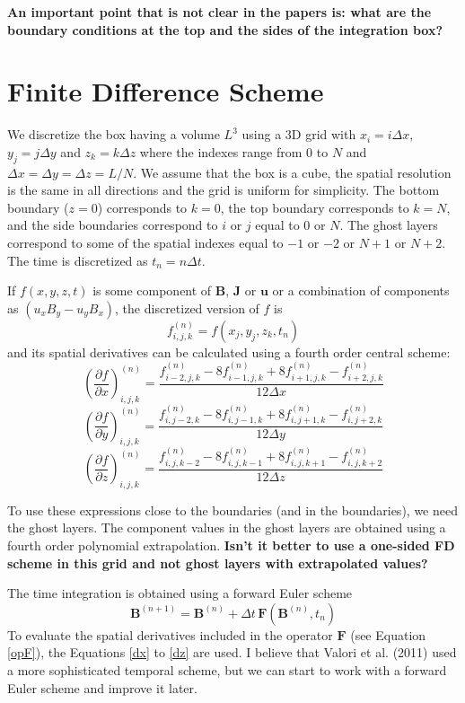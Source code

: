 \documentclass[a4paper,10pt]{article}
\def\bB{{\boldsymbol{B}}}
\def\bJ{{\boldsymbol{J}}}
\def\bu{{\boldsymbol{u}}}
\def\dx#1{\frac{\partial #1}{\partial x}}
\def\dy#1{\frac{\partial #1}{\partial y}}
\def\dz#1{\frac{\partial #1}{\partial z}}
\def\f#1#2#3#4{{f}_{#1,#2,#3}^{(#4)}}
\def\bF#1{\boldsymbol{F}(#1)}
\begin{document}
{\bf An important point that is not clear in the papers is: what are the boundary conditions at the top and the sides of the integration box?}

\section{Finite Difference Scheme}

We discretize the box having a volume $L^3$ using a 3D grid with $x_i=i\Delta x$, $y_j=j\Delta y$ and $z_k=k\Delta z$ where the indexes range from $0$ to $N$ and $\Delta x=\Delta y = \Delta z= L/N$. We assume that the box is a cube, the spatial resolution is the same in all directions and the grid is uniform for simplicity. The bottom boundary ($z=0$) corresponds to $k=0$, the top boundary corresponds to $k=N$, and the side boundaries correspond to $i$ or $j$ equal to $0$ or $N$. The ghost layers correspond to some of the spatial indexes equal to $-1$ or $-2$ or $N+1$ or $N+2$. The time is discretized as $t_n=n\Delta t$.

If $f(x,y,z,t)$ is some component of $\bB$, $\bJ$ or $\bu$ or a combination of components as $(u_xB_y-u_yB_x)$, the discretized version of $f$ is
\begin{equation}
\f{i}{j}{k}{n}=f(x_j,y_j,z_k,t_n) 
\end{equation}
and its spatial derivatives can be calculated using a fourth order central scheme:
\begin{equation}
\left(\dx{f}\right)_{i,j,k}^{(n)}=
\frac{\f{i-2}{j}{k}{n}-8\f{i-1}{j}{k}{n}+8\f{i+1}{j}{k}{n}-\f{i+2}{j}{k}{n}}{12\Delta x} 
\label{dx}
\end{equation}
\begin{equation}
\left(\dy{f}\right)_{i,j,k}^{(n)}=
\frac{\f{i}{j-2}{k}{n}-8\f{i}{j-1}{k}{n}+8\f{i}{j+1}{k}{n}-\f{i}{j+2}{k}{n}}{12\Delta y} 
\end{equation}
\begin{equation}
\left(\dz{f}\right)_{i,j,k}^{(n)}=
\frac{\f{i}{j}{k-2}{n}-8\f{i}{j}{k-1}{n}+8\f{i}{j}{k+1}{n}-\f{i}{j}{k+2}{n}}{12\Delta z} 
\label{dz}
\end{equation}

To use these expressions close to the boundaries (and in the boundaries), we need the ghost layers. The component values in the ghost layers are obtained using a fourth order polynomial extrapolation. {\bf Isn't it better to use a one-sided FD scheme in this grid and not ghost layers with extrapolated values?}

The time integration is obtained using a forward Euler scheme
\begin{equation}
 \bB^{(n+1)}=\bB^{(n)}+\Delta t \,\bF{\bB^{(n)},t_n}
\end{equation}
To evaluate the spatial derivatives included in the operator $\boldsymbol{F}$ (see Equation \ref{opF}), the Equations \ref{dx} to \ref{dz} are used. I believe that Valori et al. (2011) used a more sophisticated temporal scheme, but we can start to work with a forward  Euler scheme and improve it later.
\end{document}
